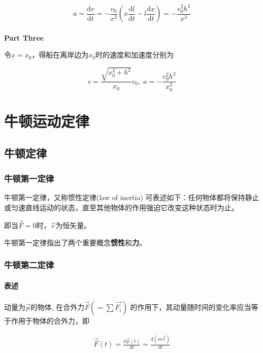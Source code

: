 \documentclass[
	12pt, %
	a4paper, %
]{myLegrandOrangeBook}
\newcommand{\rmd}{\mathrm{d}}
\newcommand{\deriv}[2]{\frac{\rmd #1}{\rmd #2}}
\begin{document}
    \[
        a = \deriv{v}{t} = - \frac{v_{0}}{x^{2}} \left(x \deriv{l}{t} - l \deriv{x}{t}\right)
        = -\frac{v_{0}^{2} h^{2}}{x^{3}}
    \]
    \\

    \textbf{Part Three}

    令\(x=x_{0}\)，得船在离岸边为\(x_{0}\)时的速度和加速度分别为

    \[
        v = \frac{\sqrt{x_{0}^{2} + h^2}}{x_{0}} v_{0},\;
        a = -\frac{v_{0}^{2} h^{2}}{x_{0}^{3}}
    \]

\chapter{牛顿运动定律}

\section{牛顿定律}

\subsection{牛顿第一定律}

    牛顿第一定律，又称惯性定律(law of inertia) 可表述如下：任何物体都将保持静止
    或匀速直线运动的状态，直至其他物体的作用强迫它改变这种状态时为止。

    即当\(\overrightarrow{F} = 0\)时，\(\overrightarrow{v}\)为恒矢量。

    牛顿第一定律指出了两个重要概念\textbf{惯性}和\textbf{力}。

\subsection{牛顿第二定律}

\subsubsection*{表述}

    动量为\(\overrightarrow{p}\)的物体, 在合外力\(\overrightarrow{F} \left(=\sum \overrightarrow{F_{i}}\right)\)
    的作用下，其动量随时间的变化率应当等于作用于物体的合外力，即

    \begin{align}
        \overrightarrow{F}\left(t\right) = \deriv{\overrightarrow{p}\left(t\right)}{t} =
        \deriv{\left(m\overrightarrow{v}\right)}{t}
    \end{align}
\end{document}
